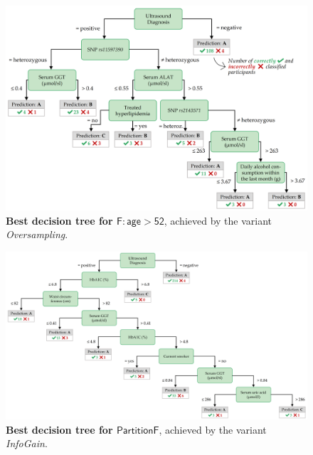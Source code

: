 \documentclass[
  oneside]{book}
\begin{document}
\begin{figure}

{\centering \includegraphics[width=1\linewidth]{figures/03-tree-menopause} 

}

\caption{\textbf{Best decision tree for \(\mathsf{F:age>52}\)}, achieved by the variant \emph{Oversampling}.}\label{fig:03-tree-menopause}
\end{figure}



\begin{figure}

{\centering \includegraphics[width=1\linewidth]{figures/03-tree-women} 

}

\caption{\textbf{Best decision tree for \(\mathsf{PartitionF}\)}, achieved by the variant \emph{InfoGain}.}\label{fig:03-tree-women}
\end{figure}
\end{document}
